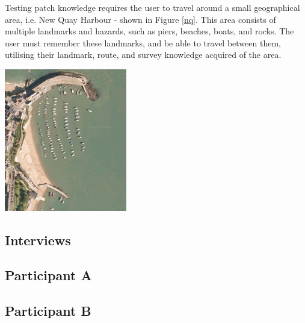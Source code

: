 \documentclass[a4paper, openright, twoside]{book}
\begin{document}
Testing patch knowledge requires the user to travel around a small geographical area, i.e. New Quay Harbour - shown in Figure \ref{nq}. This area consists of multiple landmarks and hazards, such as piers, beaches, boats, and rocks. The user must remember these landmarks, and be able to travel between them, utilising their landmark, route, and survey knowledge acquired of the area. 

\begin{minipage}{\textwidth}
\hfill \break
\centering
\includegraphics[width=0.4\textwidth]{images/new_quay}
\label{nq}
\hfill \break
\end{minipage}



\begin{appendices}
\chapter{Interviews}
\section{Participant A}
\section{Participant B}
\end{appendices}

\clearpage


\end{document}
